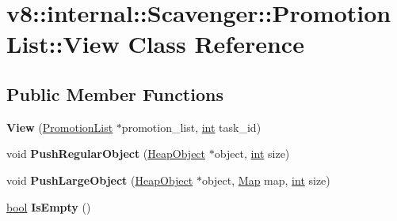 \hypertarget{classv8_1_1internal_1_1Scavenger_1_1PromotionList_1_1View}{}\section{v8\+:\+:internal\+:\+:Scavenger\+:\+:Promotion\+List\+:\+:View Class Reference}
\label{classv8_1_1internal_1_1Scavenger_1_1PromotionList_1_1View}
\subsection*{Public Member Functions}
\begin{DoxyCompactItemize}
\item 
\mbox{\label{classv8_1_1internal_1_1Scavenger_1_1PromotionList_1_1View_a13f9a858b879ff14a34595ccf5b86c38}} 
{\bfseries View} (\mbox{\hyperlink{classv8_1_1internal_1_1Scavenger_1_1PromotionList}{Promotion\+List}} $\ast$promotion\+\_\+list, \mbox{\hyperlink{classint}{int}} task\+\_\+id)
\item 
\mbox{\label{classv8_1_1internal_1_1Scavenger_1_1PromotionList_1_1View_ab9a16194daa0a0f106aed2b30b18d160}} 
void {\bfseries Push\+Regular\+Object} (\mbox{\hyperlink{classv8_1_1internal_1_1HeapObject}{Heap\+Object}} $\ast$object, \mbox{\hyperlink{classint}{int}} size)
\item 
\mbox{\label{classv8_1_1internal_1_1Scavenger_1_1PromotionList_1_1View_ad3aeda34f9dadb7d332e87ff5fc690ce}} 
void {\bfseries Push\+Large\+Object} (\mbox{\hyperlink{classv8_1_1internal_1_1HeapObject}{Heap\+Object}} $\ast$object, \mbox{\hyperlink{classv8_1_1internal_1_1Map}{Map}} map, \mbox{\hyperlink{classint}{int}} size)
\item 
\mbox{\label{classv8_1_1internal_1_1Scavenger_1_1PromotionList_1_1View_a4cdfab947f7f9309cb124502805aff44}} 
\mbox{\hyperlink{classbool}{bool}} {\bfseries Is\+Empty} ()
\item 
\mbox{\label{classv8_1_1internal_1_1Scavenger_1_1PromotionList_1_1View_a8523b3b52db0a36d7085f97f4f7575c4}} 

\end{DoxyCompactItemize}
